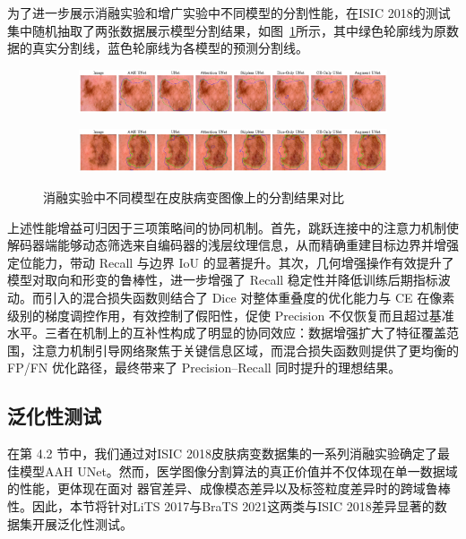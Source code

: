 为了进一步展示消融实验和增广实验中不同模型的分割性能，在ISIC 2018的测试集中随机抽取了两张数据展示模型分割结果，如图~\ref{fig:ablation_results}所示，其中绿色轮廓线为原数据的真实分割线，蓝色轮廓线为各模型的预测分割线。

\begin{figure}[!htbp]
    \centering
    \begin{subfigure}{\linewidth}
        \centering
        \includegraphics[width=\linewidth]{fig/ablation_compare_row1.png}
    \end{subfigure}
    
    \vspace{0.5em}  %

    \begin{subfigure}{\linewidth}
        \centering
        \includegraphics[width=\linewidth]{fig/ablation_compare_row2.png}
    \end{subfigure}

    \caption{消融实验中不同模型在皮肤病变图像上的分割结果对比}
    \label{fig:ablation_results}
\end{figure}

上述性能增益可归因于三项策略间的协同机制。首先，跳跃连接中的注意力机制使解码器端能够动态筛选来自编码器的浅层纹理信息，从而精确重建目标边界并增强定位能力，带动 Recall 与边界 IoU 的显著提升。其次，几何增强操作有效提升了模型对取向和形变的鲁棒性，进一步增强了 Recall 稳定性并降低训练后期指标波动。而引入的混合损失函数则结合了 Dice 对整体重叠度的优化能力与 CE 在像素级别的梯度调控作用，有效控制了假阳性，促使 Precision 不仅恢复而且超过基准水平。三者在机制上的互补性构成了明显的协同效应：数据增强扩大了特征覆盖范围，注意力机制引导网络聚焦于关键信息区域，而混合损失函数则提供了更均衡的 FP/FN 优化路径，最终带来了 Precision–Recall 同时提升的理想结果。

\subsection{泛化性测试}

在第 4.2 节中，我们通过对ISIC 2018皮肤病变数据集的一系列消融实验确定了最佳模型AAH UNet。然而，医学图像分割算法的真正价值并不仅体现在单一数据域的性能，更体现在面对 器官差异、成像模态差异以及标签粒度差异时的跨域鲁棒性。因此，本节将针对LiTS 2017与BraTS 2021这两类与ISIC 2018差异显著的数据集开展泛化性测试。

